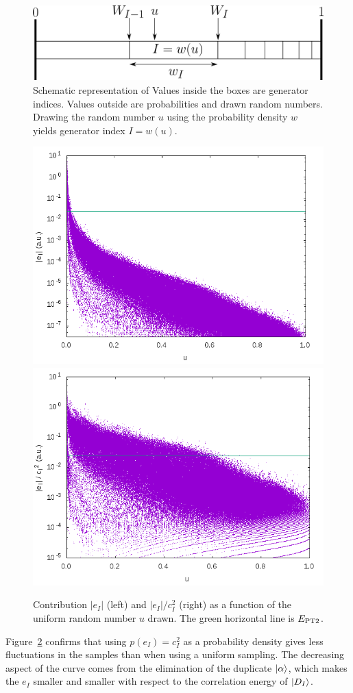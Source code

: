 \documentclass[./thesis.tex]{subfiles}
\begin{document}
\begin{figure}[h!]
	\begin{center}
		\includegraphics[width=0.7\columnwidth]{figures/pt2/mc_representation}
	\end{center}
	\caption{Schematic representation of 
Values inside the boxes are generator indices. Values outside are probabilities and drawn random numbers.
Drawing the random number $u$ using the probability density $w$ yields generator index $I=w(u)$.}
	\label{fig:mc_representation}
\end{figure}

\begin{figure}[h]
	\begin{center}
		\includegraphics[width=0.49\columnwidth]{figures/pt2/eI}
		\includegraphics[width=0.49\columnwidth]{figures/pt2/eici2}
	\end{center}
		\caption{Contribution $|e_I|$ (left) and $|e_I|/c_I^2$ (right) as a function of the uniform random number $u$ drawn. The green horizontal line is $E_\text{PT2}$.}
		\label{fig:ei}
\end{figure}
Figure~\ref{fig:ei} confirms that using $p(e_I) = c_I^2$ as a probability density gives less
fluctuations in the samples than when using a uniform sampling. The decreasing aspect of the curve
comes from the elimination of the duplicate ${\ket{\alpha}}$, which makes the $e_I$ smaller and smaller with respect to
the correlation energy of ${\ket{D_I}}$.
\end{document}
